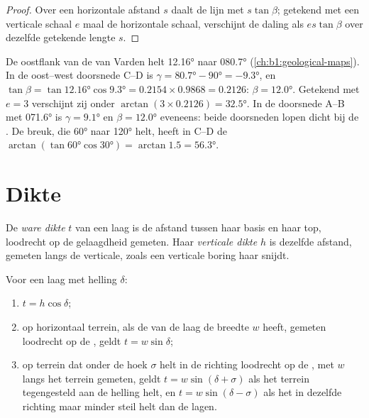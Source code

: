 \begin{proof}
Over een horizontale afstand $s$ daalt de lijn met $s\tan\beta$; getekend met een verticale schaal $e$ maal de
horizontale schaal, verschijnt de daling als $es\tan\beta$ over dezelfde getekende lengte $s$.
\end{proof}

\begin{example}
De oostflank van de  van Varden helt \ang{12.16} naar \ang{080.7}
(\cref{ch:b1:geological-maps}). In de oost--west doorsnede C--D is
$\gamma = \ang{80.7} - \ang{90} = \ang{-9.3}$, en $\tan\beta =
\tan\ang{12.16}\cos\ang{9.3} = 0.2154\times0.9868 = 0.2126$: $\beta =
\ang{12.0}$. Getekend met $e = 3$ verschijnt zij onder $\arctan(3\times0.2126) =
\ang{32.5}$. In de doorsnede A--B met  \ang{071.6} is $\gamma = \ang{9.1}$
en $\beta = \ang{12.0}$ eveneens: beide doorsneden lopen dicht bij de . De breuk, die
\ang{60} naar \ang{120} helt, heeft in C--D de 
$\arctan(\tan\ang{60}\cos\ang{30}) = \arctan 1.5 = \ang{56.3}$.
\end{example}

\section{Dikte}

\begin{definition}\label{def:b1:cross-sections:thickness}
De \emph{ware dikte} $t$ van een laag is de afstand tussen haar basis en haar top, loodrecht
op de gelaagdheid gemeten. Haar \emph{verticale dikte} $h$ is dezelfde afstand, gemeten langs
de verticale, zoals een verticale boring haar snijdt.
\end{definition}

\begin{proposition}\label{prop:b1:cross-sections:thickness}
Voor een laag met helling $\delta$:
\begin{enumerate}
  \item $t = h\cos\delta$;
  \item op horizontaal terrein, als de  van de laag de breedte $w$ heeft, gemeten loodrecht op de
        , geldt $t = w\sin\delta$;
  \item op terrein dat onder de hoek $\sigma$ helt in de richting loodrecht op de , met $w$ langs het
        terrein gemeten, geldt $t = w\sin(\delta + \sigma)$ als het terrein tegengesteld aan de helling helt, en
        $t = w\sin(\delta - \sigma)$ als het in dezelfde richting maar minder steil helt dan de lagen.
\end{enumerate}
\end{proposition}

